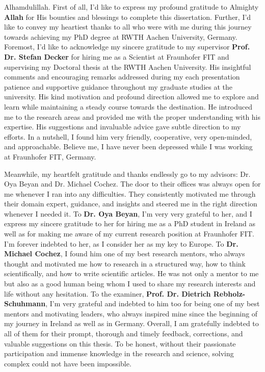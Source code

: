 

\begin{acknowledgements}

Alhamdulillah. First of all, I'd like to express my profound gratitude to Almighty \textbf{Allah} for His bounties and blessings to complete this dissertation. Further, I'd like to convey my heartiest thanks to all who were with me during this journey towards achieving my PhD degree at RWTH Aachen University, Germany. Foremost, I'd like to acknowledge my sincere gratitude to my supervisor \textbf{Prof. Dr. Stefan Decker} for hiring me as a Scientist at Fraunhofer FIT and supervising my Doctoral thesis at the RWTH Aachen University. His insightful comments and encouraging remarks addressed during my each presentation patience and supportive guidance throughout my graduate studies at the university. His kind motivation and profound direction allowed me to explore and learn while maintaining a steady course towards the destination. He introduced me to the research areas and provided me with the proper understanding with his expertise. His suggestions and invaluable advice gave subtle direction to my efforts. In a nutshell, I found him very friendly, cooperative, very open-minded, and approachable. Believe me, I have never been depressed while I was working at Fraunhofer FIT, Germany. 

\hspace*{5mm} Meanwhile, my heartfelt gratitude and thanks endlessly go to my advisors: Dr. Oya Beyan and Dr. Michael Cochez. The door to their offices was always open for me whenever I ran into any difficulties. They consistently motivated me through their domain expert, guidance, and insights and steered me in the right direction whenever I needed it. To \textbf{Dr. Oya Beyan}, I'm very very grateful to her, and I express my sincere gratitude to her for hiring me as a PhD student in Ireland as well as for making me aware of my current research position at Fraunhofer FIT. I'm forever indebted to her, as I consider her as my key to Europe. To \textbf{Dr. Michael Cochez}, I found him one of my best research mentors, who always thought and motivated me how to research in a structured way, how to think scientifically, and how to write scientific articles. He was not only a mentor to me but also as a good human being whom I used to share my research interests and life without any hesitation. To the examiner, \textbf{Prof. Dr. Dietrich Rebholz-Schuhmann}, I'm very grateful and indebted to him too for being one of my best mentors and motivating leaders, who always inspired mine since the beginning of my journey in Ireland as well as in Germany. Overall, I am gratefully indebted to all of them for their prompt, thorough and timely feedback, corrections, and valuable suggestions on this thesis. To be honest, without their passionate participation and immense knowledge in the research and science, solving complex could not have been impossible.  


\end{acknowledgements}
